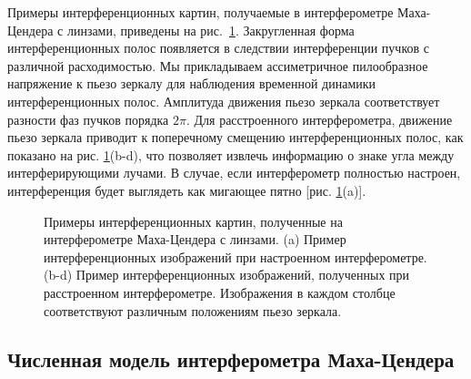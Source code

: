Примеры интерференционных картин, получаемые в интерферометре Маха-Цендера с линзами, приведены на рис.~\ref{fig:visib_lens_expl}. Закругленная форма интерференционных полос появляется в следствии интерференции пучков с различной расходимостью. Мы прикладываем ассиметричное пилообразное напряжение к пьезо зеркалу для наблюдения временной динамики интерференционных полос. Амплитуда движения пьезо зеркала соответствует разности фаз пучков порядка $2\pi$. Для расстроенного интерферометра, движение пьезо зеркала приводит к поперечному смещению интерференционных полос, как показано на рис. \ref{fig:visib_lens_expl}(b-d), что позволяет извлечь информацию о знаке угла между интерферирующими лучами. В случае, если интерферометр полностью настроен, интерференция будет выглядеть как мигающее пятно [рис. \ref{fig:visib_lens_expl}(a)].

\begin{figure}[ht]
\caption{Примеры интерференционных картин, полученные на интерферометре Маха-Цендера с линзами. (a) Пример интерференционных изображений при настроенном интерферометре. (b-d) Пример интерференционных изображений, полученных при расстроенном интерферометре. Изображения в каждом столбце соответствуют различным положениям пьезо зеркала.}
\label{fig:visib_lens_expl}
\end{figure}

\subsection{Численная модель интерферометра Маха-Цендера}\label{sec:ch2/sec1/subsec6}

